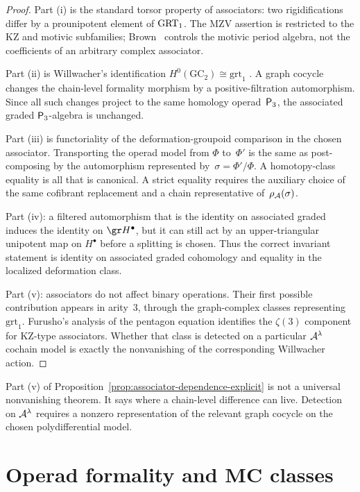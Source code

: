 \begin{proof}
Part (i) is the standard torsor property of associators: two
rigidifications differ by a prounipotent element of
$\mathrm{GRT}_1$. The MZV assertion is restricted to the KZ and motivic
subfamilies; Brown~\cite{Brown12} controls the motivic period
algebra, not the coefficients of an arbitrary complex associator.

Part (ii) is Willwacher's identification
$H^0(\mathrm{GC}_2)\cong\mathrm{grt}_1$
\cite{Willwacher15}. A graph cocycle changes the chain-level
formality morphism by a positive-filtration automorphism. Since
all such changes project to the same homology operad~$\mathsf{P}_3$,
the associated graded $\mathsf{P}_3$-algebra is unchanged.

Part (iii) is functoriality of the deformation-groupoid comparison
in the chosen associator. Transporting the operad model from
$\Phi$ to~$\Phi'$ is the same as post-composing by the automorphism
represented by~$\sigma=\Phi'/\Phi$. A homotopy-class equality is
all that is canonical. A strict equality requires the auxiliary
choice of the same cofibrant replacement and a chain representative
of~$\rho_{\mathcal{A}}(\sigma)$.

Part (iv): a filtered automorphism that is the identity on associated
graded induces the identity on $\gr H^\bullet$, but it can still act
by an upper-triangular unipotent map on $H^\bullet$ before a splitting
is chosen. Thus the correct invariant statement is identity on
associated graded cohomology and equality in the localized
deformation class.

Part (v): associators do not affect binary operations. Their first
possible contribution appears in arity~$3$, through the graph-complex
classes representing $\mathrm{grt}_1$. Furusho's analysis of the
pentagon equation identifies the $\zeta(3)$ component for KZ-type
associators. Whether that class is detected on a particular
$\mathcal{A}^\lambda$ cochain model is exactly the nonvanishing of the
corresponding Willwacher action.
\end{proof}

\begin{remark}
Part (v) of
Proposition~\ref{prop:associator-dependence-explicit} is
not a universal nonvanishing theorem. It says where a
chain-level difference can live. Detection on
$\mathcal{A}^\lambda$ requires a nonzero representation of the relevant
graph cocycle on the chosen polydifferential model.
\end{remark}

\section{Operad formality and MC classes}
\label{sec:formality-lift}

